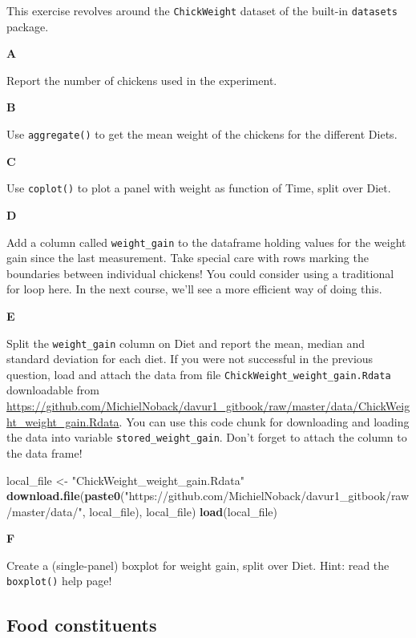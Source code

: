 \documentclass[]{book}
\newenvironment{Shaded}{\begin{snugshade}}{\end{snugshade}}
\newcommand{\KeywordTok}[1]{\textcolor[rgb]{0.13,0.29,0.53}{\textbf{#1}}}
\newcommand{\NormalTok}[1]{#1}
\newcommand{\StringTok}[1]{\textcolor[rgb]{0.31,0.60,0.02}{#1}}
\begin{document}
This exercise revolves around the \texttt{ChickWeight} dataset of the built-in \texttt{datasets} package.

\textbf{A}

Report the number of chickens used in the experiment.

\textbf{B}

Use \texttt{aggregate()} to get the mean weight of the chickens for the different Diets.

\textbf{C}

Use \texttt{coplot()} to plot a panel with weight as function of Time, split over Diet.

\textbf{D}

Add a column called \texttt{weight\_gain} to the dataframe holding values for the weight gain since the last measurement. Take special care with rows marking the boundaries between individual chickens! You could consider using a traditional for loop here.
In the next course, we'll see a more efficient way of doing this.

\textbf{E}

Split the \texttt{weight\_gain} column on Diet and report the mean, median and standard deviation for each diet.
If you were not successful in the previous question, load and attach the data from file \texttt{ChickWeight\_weight\_gain.Rdata} downloadable from \url{https://github.com/MichielNoback/davur1_gitbook/raw/master/data/ChickWeight_weight_gain.Rdata}. You can use this code chunk for downloading and loading the data into variable \texttt{stored\_weight\_gain}. Don't forget to attach the column to the data frame!

\begin{Shaded}
\begin{Highlighting}[]
\NormalTok{local_file <-}\StringTok{ "ChickWeight_weight_gain.Rdata"}
\KeywordTok{download.file}\NormalTok{(}\KeywordTok{paste0}\NormalTok{(}\StringTok{"https://github.com/MichielNoback/davur1_gitbook/raw/master/data/"}\NormalTok{, local_file), local_file)}
\KeywordTok{load}\NormalTok{(local_file)}
\end{Highlighting}
\end{Shaded}

\textbf{F}

Create a (single-panel) boxplot for weight gain, split over Diet. Hint: read the \texttt{boxplot()} help page!

\hypertarget{food-constituents}{%
\subsection{Food constituents}\label{food-constituents}}
\end{document}
